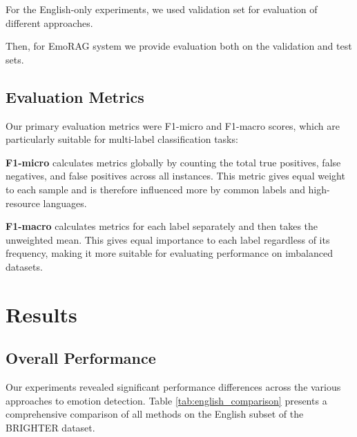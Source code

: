 \documentclass[a4paper,12pt]{extarticle}
\begin{document}
For the English-only experiments, we used validation set for evaluation of different approaches.

Then, for EmoRAG system we provide evaluation both on the validation and test sets.

\subsection{Evaluation Metrics}

Our primary evaluation metrics were F1-micro and F1-macro scores, which are particularly suitable for multi-label classification tasks:

\textbf{F1-micro} calculates metrics globally by counting the total true positives, false negatives, and false positives across all instances. This metric gives equal weight to each sample and is therefore influenced more by common labels and high-resource languages.

\textbf{F1-macro} calculates metrics for each label separately and then takes the unweighted mean. This gives equal importance to each label regardless of its frequency, making it more suitable for evaluating performance on imbalanced datasets.

\section{Results}

\subsection{Overall Performance}

Our experiments revealed significant performance differences across the various approaches to emotion detection. Table \ref{tab:english_comparison} presents a comprehensive comparison of all methods on the English subset of the BRIGHTER dataset.
\end{document}
